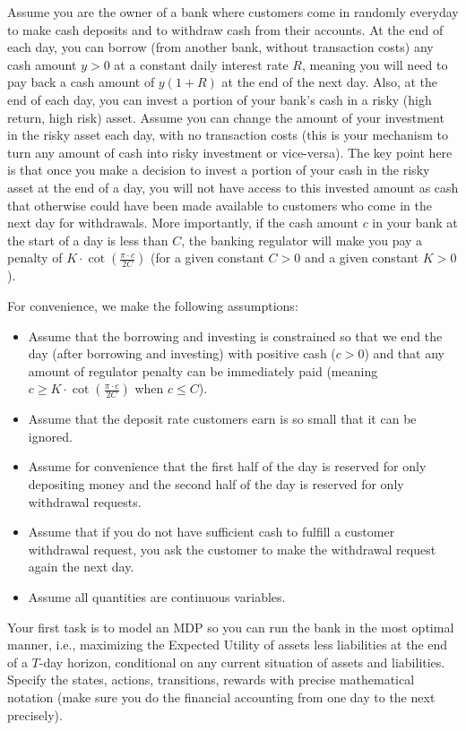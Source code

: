 \documentclass[12pt]{exam}
\begin{document}
\begin{questions}
\question Assume you are the owner of a bank where customers come in randomly everyday to make cash deposits and to withdraw cash from their accounts. At the end of each day, you can borrow (from another bank, without transaction costs) any cash amount $y > 0$ at a constant daily interest rate $R$, meaning you will need to pay back a cash amount of $y(1+R)$ at the end of the next day. Also, at the end of each day, you can invest a portion of your bank's cash in a risky (high return, high risk) asset. Assume you can change the amount of your investment in the risky asset each day, with no transaction costs (this is your mechanism to turn any amount of cash into risky investment or vice-versa). The key point here is that once you make a decision to invest a portion of your cash in the risky asset at the end of a day, you will not have access to this invested amount as cash that otherwise could have been made available to customers who come in the next day for withdrawals. More importantly, if the cash amount $c$ in your bank at the start of a day is less than $C$, the banking regulator will make you pay a penalty of $K \cdot \cot(\frac {\pi \cdot c}{2C})$ (for a given constant $C > 0$ and a given constant $K > 0$).

For convenience, we make the following assumptions:
\begin{itemize}
\item  Assume that the borrowing and investing is constrained so that we end the day (after borrowing and investing) with positive cash ($c >  0$) and that any amount of regulator penalty can be immediately paid (meaning $c \geq K \cdot \cot(\frac {\pi \cdot c}{2C})$ when $c \leq C$).
\item Assume that the deposit rate customers earn is so small that it can be ignored.
\item Assume for convenience that the first half of the day is reserved for only depositing money and the second half of the day is reserved for only withdrawal requests.
\item Assume that if you do not have sufficient cash to fulfill a customer withdrawal request, you ask the customer to make the withdrawal request again the next day.
\item Assume all quantities are continuous variables.
\end{itemize}

Your first task is to model an MDP so you can run the bank in the most optimal manner, i.e., maximizing the Expected Utility of assets less liabilities at the end of a $T$-day horizon, conditional on any current situation of assets and liabilities. Specify the states, actions, transitions, rewards with precise mathematical notation (make sure you do the financial accounting from one day to the next precisely).


\end{questions}
\end{document}
